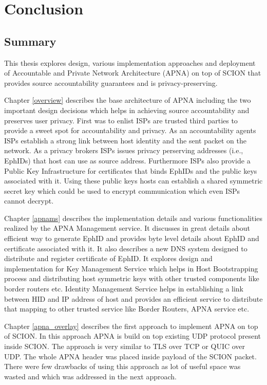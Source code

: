 
\chapter{Conclusion} %

\label{conclusion}

\section{Summary}

This thesis explores design, various implementation approaches and deployment of Accountable and Private Network Architecture (APNA) on top of SCION that provides source accountability guarantees and is privacy-preserving.

Chapter \ref{overview} describes the base architecture of APNA including the two important design decisions which helps in achieving source accountability and preserves user privacy. First was to enlist ISPs are trusted third parties to provide a sweet spot for accountability and privacy. As an accountability agents ISPs establish a strong link between host identity and the sent packet on the network. As a privacy brokers ISPs issues privacy perserving addresses (i.e., EphIDs) that host can use as source address. Furthermore ISPs also provide a Public Key Infrastructure for certificates that binds EphIDs and the public keys associated with it. Using these public keys hosts can establish a shared symmetric secret key which could be used to encrypt communication which even ISPs cannot decrypt.

Chapter \ref{apnams} describes the implementation details and various  functionalities realized by the APNA Management service. It discusses in great details about efficient way to generate EphID and provides byte level details about EphID and certificate associated with it. It also describes a new DNS system designed to distribute and register certificate of EphID. It explores design and implementation for Key Management Service which helps in Host Bootstrapping process and distributing host symmetric keys with other trusted components like border routers etc. Identity Management Service helps in establishing a link between HID and IP address of host and provides an efficient service to distribute that mapping to other trusted service like Border Routers, APNA service etc.

Chapter \ref{apna_overlay} describes the first approach to implement APNA on top of SCION. In this approach APNA is build on top existing UDP protocol present inside SCION. The approach is very similar to TLS over TCP or QUIC over UDP. The whole APNA header was placed inside payload of the SCION packet. There were few drawbacks of using this approach as lot of useful space was wasted and which was addressed in the next approach.

